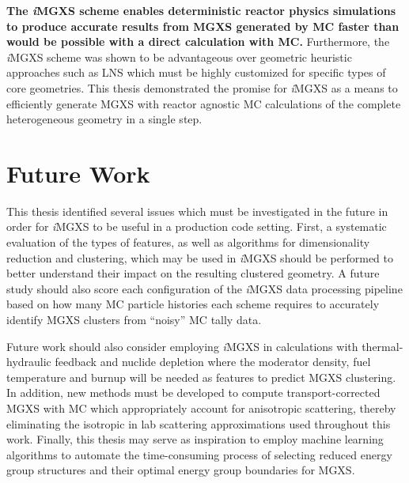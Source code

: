 
\textbf{The \textit{i}MGXS scheme enables deterministic reactor physics simulations to produce accurate results from MGXS generated by MC faster than would be possible with a direct calculation with MC.} Furthermore, the \textit{i}MGXS scheme was shown to be advantageous over geometric heuristic approaches such as LNS which must be highly customized for specific types of core geometries. This thesis demonstrated the promise for \textit{i}MGXS as a means to efficiently generate MGXS with reactor agnostic MC calculations of the complete heterogeneous geometry in a single step.


\section{Future Work}
\label{chap:future-work}

This thesis identified several issues which must be investigated in the future in order for \textit{i}MGXS to be useful in a production code setting. First, a systematic evaluation of the types of features, as well as algorithms for dimensionality reduction and clustering, which may be used in \textit{i}MGXS should be performed to better understand their impact on the resulting clustered geometry. A future study should also score each configuration of the \textit{i}MGXS data processing pipeline based on how many MC particle histories  each scheme requires to accurately identify MGXS clusters from ``noisy'' MC tally data. 

Future work should also consider employing \textit{i}MGXS in calculations with thermal-hydraulic feedback and nuclide depletion where the moderator density, fuel temperature and burnup will be needed as features to predict MGXS clustering. In addition, new methods must be developed to compute transport-corrected MGXS with MC which appropriately account for anisotropic scattering, thereby eliminating the isotropic in lab scattering approximations used throughout this work. Finally, this thesis may serve as inspiration to employ machine learning algorithms to automate the time-consuming process of selecting reduced energy group structures and their optimal energy group boundaries for MGXS.

